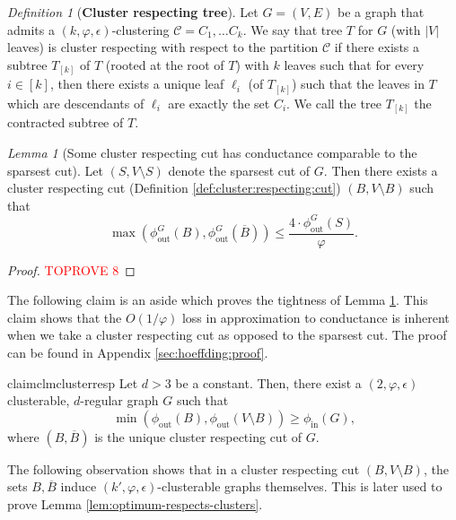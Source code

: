 \documentclass[letterpaper,11pt]{article}
\newcommand{\cC}{\mathcal{C}}
\theoremstyle{plain}
\theoremstyle{definition}
\theoremstyle{remark}
\newtheorem{lemmma}{Lemma}
\newtheorem{mydef}{Definition}
\newcommand{\e}{\epsilon}
\begin{document}
\begin{mydef}[\textbf{Cluster respecting  tree}] \label{def:cluster:resp:tree}
Let $G=(V,E)$ be a graph that admits a $(k, \varphi, \epsilon)$-clustering $\cC=C_1, \ldots C_k$. We say that tree $T$ for $G$ (with $|V|$ leaves) is cluster respecting with respect to the partition $\cC $ if there exists a subtree $T_{[k]}$ of $T$ (rooted at the root of $T$) with $k$ leaves such that for every $i \in [k]$, then there exists a unique leaf $\ell_i$ (of $T_{[k]}$) such that the leaves in $T$ which are descendants of $\ell_i$ are exactly the set $C_i$. We call the tree $T_{[k]}$ the contracted subtree of $T$.
\end{mydef}

\begin{lemmma}[Some cluster respecting cut has conductance comparable to the sparsest cut]  
	\label{lem:cluster-respecting-cuts}
  Let $(S, V \setminus S)$
	denote the sparsest cut of $G$. Then there exists a cluster respecting cut
	(Definition \ref{def:cluster:respecting:cut}) $(B, V \setminus B)$ such that \[\max(\phi_{\text{out}}^G(B), \phi_{\text{out}}^G(\overline{B})) \leq \frac{4\cdot \phi_{\text{out}}^G(S)}{\varphi}  \text{.}\]
\end{lemmma}

\begin{proof}\textcolor{red}{TOPROVE 8}\end{proof}



The following claim is an aside which proves the tightness of Lemma \ref{lem:cluster-respecting-cuts}.
This claim shows that the $O(1/\varphi)$ loss in approximation to conductance is inherent when we 
take a cluster respecting cut as opposed to the sparsest cut. The proof can be found in 
Appendix \ref{sec:hoeffding:proof}.

\begin{restatable}{claim}{clmclusterresp} \label{clm:cluster:resp:lb}
	Let $d > 3$ be a constant. 
	Then, there exist a $(2, \varphi, \e)$ clusterable, $d$-regular graph $G$ such that
\[\min \left(\phi_{\text{out}}(B), \phi_{\text{out}}(V\setminus B) \right) \geq \phi_{\text{in}}(G) \text{,}\]
	where $(B, \overline{B})$ is the unique cluster respecting cut of $G$.
\end{restatable}

The following observation shows that in a cluster respecting cut $(B, V\setminus B)$, the sets $B, \overline{B}$ induce $(k', \varphi, \e)$-clusterable graphs themselves. This is later used to prove Lemma 
\ref{lem:optimum-respects-clusters}.
\end{document}
